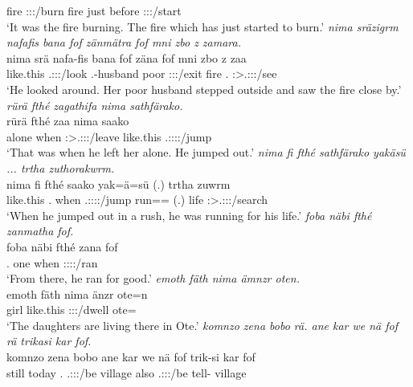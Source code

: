 \begin{exe}
	fire \Sg:\Sbj:\Pst:\Dur/burn fire just before \Sg:\Sbj:\Pst:\Pfv/start\\
	\trans `It was the fire burning. The fire which has just started to burn.'
	\emph{nima sräzigrm nafafis bana fof zänmätra fof mni zbo z zamara.}\\
	\gll nima srä nafa-fis bana fof zäna fof mni zbo z zaa\\
	{like.this} \Tsg.\Masc:\Sbj:\Irr:\Pfv/look \Third.\Poss-husband poor \Emph{} \Sg:\Sbj:\Pst:\Pfv/exit \Emph{} fire \Prox.\All{} \Iam{} \Sg:\Sbj>\Tsg.\F:\Obj:\Pst:\Pfv/see\\
	\trans `He looked around. Her poor husband stepped outside and saw the fire close by.'
	\emph{rürä fthé zagathifa nima sathfärako.}\\
	\gll rürä fthé zaa nima saako\\
	alone when \Sg:\Sbj>\Tsg.\F:\Obj:\Pst:\Pfv/leave {like.this} \Tsg.\Masc:\Sbj:\Pst:\Pfv:\Andat/jump\\
	\trans `That was when he left her alone. He jumped out.'
	\emph{nima fi fthé sathfärako yakäsü ... trtha zuthorakwrm.}\\
	\gll nima fi fthé saako yak=ä=sü (.) trtha zuwrm\\
	{like.this} \Third.\Abs{} when \Tsg.\Masc:\Sbj:\Pst:\Pfv:\Andat/jump run=\Assoc=\Etc{} (.) life \Sg:\Sbj>\Tsg.\F:\Obj:\Pst:\Dur/search\\
	\trans `When he jumped out in a rush, he was running for his life.'
	\emph{foba näbi fthé zanmatha fof.}\\
	\gll foba näbi fthé zana fof\\
	\Dist.\Abl{} one when \Sg:\Sbj:\Pst:\Pfv:\Venit/ran \Emph\\
	\trans `From there, he ran for good.'
	\emph{emoth fäth nima ämnzr oten.}\\
	\gll emoth fäth nima änzr ote=n\\
	girl \Dim{} {like.this} \Stpl:\Sbj:\Nonpast:\Ipfv/dwell ote=\Loc{}\\
	\trans `The daughters are living there in Ote.'
	\emph{komnzo zena bobo rä. ane kar we nä fof rä trikasi kar fof.}\\
	\gll komnzo zena bobo  ane kar we nä fof  trik-si kar fof\\
	still today \Med.\Abl{} \Tsg.\F:\Sbj:\Nonpast:\Ipfv/be \Dem{} village also \Indf{} \Emph{} \Tsg.\F:\Sbj:\Nonpast:\Ipfv/be tell-\Nmlz{} village \Emph{}\\

\end{exe}
